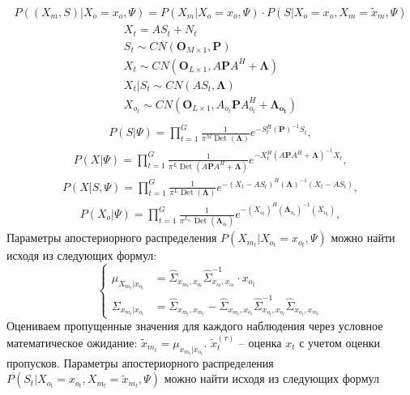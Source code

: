 \documentclass[11pt]{article}
\DeclareMathOperator{\Det}{Det}
\begin{document}
\begin{gather}
P((X_m,S)|X_o=x_o,\Psi) = P(X_m|X_o = x_o, \Psi) \cdot P(S|X_o = x_o, X_m=\widetilde{x}_m, \Psi)
\end{gather}
\begin{gather*}
X_t = AS_t + N_t \\
S_t \sim CN(\mathbf{O}_{M \times 1}, \mathbf{P}) \\
X_t \sim CN(\mathbf{O}_{L \times 1}, A\mathbf{P}A^H + \mathbf{\Lambda})\\
X_t|S_t \sim CN(AS_t,  \mathbf{\Lambda})\\
X_{o_t} \sim CN(\mathbf{O}_{L \times 1}, A_{o_t}\mathbf{P}A_{o_t}^H + \mathbf{\Lambda_{o_t}})\\
\end{gather*}
\begin{gather}
P(S|\Psi) = \prod_{t=1}^G \frac{1}{\pi^M \Det(\mathbf{\Lambda})}e^{-S_t^H (\mathbf{P})^{-1}S_t},
\end{gather}
\begin{gather}
P(X|\Psi) = \prod_{t=1}^G \frac{1}{ \pi^L \Det(A\mathbf{P}A^H + \mathbf{\Lambda}) } e^{-X_t^H (A\mathbf{P}A^H + \mathbf{\Lambda})^{-1}X_t},
\end{gather}
\begin{gather}
P(X|S,\Psi) = \prod_{t=1}^G \frac{1}{\pi^L \Det(\mathbf{\Lambda}) }e^{-(X_t-AS_t)^H (\mathbf{\Lambda})^{-1}(X_t-AS_t)},
\end{gather}
\begin{gather}
P(X_o|\Psi) = \prod_{t=1}^G \frac{1}{\pi^{L_{o_t}} \Det(\mathbf{\Lambda}_{o_t})}e^{-(X_{o_t})^H (\mathbf{\Lambda}_{o_t})^{-1}(X_{o_t})},
\end{gather}
Параметры апостериорного распределения $P(X_{m_t}|X_{o_t}=x_{o_t},\Psi)$ можно найти исходя из следующих формул:
\begin{equation}
\left\{ \begin{aligned} 
\mu_{X_{m_t}|x_{o_t}} &= \hat{\Sigma}_{x_{m_t},x_{o_t}}\hat{\Sigma}_{x_{o_t},x_{o_t}}^{-1}\cdot x_{o_t} \\
\Sigma_{x_{m_t}|x_{o_t}} &= \hat{\Sigma}_{x_{m_t},x_{m_t}}-\hat{\Sigma}_{x_{m_t},x_{o_t}}\hat{\Sigma}_{x_{o_t},x_{o_t}}^{-1}\hat{\Sigma}_{x_{o_t},x_{m_t}}
\end{aligned} \right.
\end{equation}
Оцениваем пропущенные значения для каждого наблюдения через условное математическое ожидание:
$\widetilde{x}_{m_t} = \mu_{x_{m_t}|x_{o_t}}$. $\widetilde{x}_t^{(\tau)}$ -- оценка $x_t$ с учетом оценки пропусков.
Параметры апостериорного распределения $P(S_t|X_{o_t} = x_{o_t}, X_{m_t} = \widetilde{x}_{m_t}, \Psi)$ можно найти исходя из следующих формул
\end{document}
